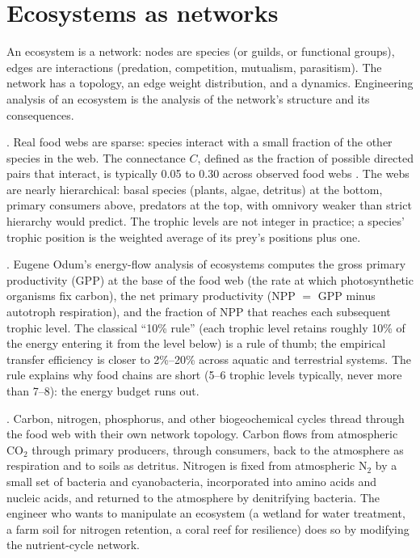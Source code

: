 \section{Ecosystems as networks}

An ecosystem is a network: nodes are species (or guilds, or
functional groups), edges are interactions (predation, competition,
mutualism, parasitism). The network has a topology, an edge weight
distribution, and a dynamics. Engineering analysis of an ecosystem
is the analysis of the network's structure and its consequences.

. Real food webs are sparse: species
interact with a small fraction of the other species in the web. The
connectance $C$, defined as the fraction of possible directed pairs
that interact, is typically 0.05 to 0.30 across observed food webs
\cite[ch.~4]{text:v6c08-may-stability}. The webs are nearly hierarchical:
basal species (plants, algae, detritus) at the bottom, primary
consumers above, predators at the top, with omnivory weaker than
strict hierarchy would predict. The trophic levels are not integer
in practice; a species' trophic position is the weighted average
of its prey's positions plus one.



. Eugene
Odum's energy-flow analysis of ecosystems
\cite[chs.~3--4]{text:v6c08-odum-1971} computes the gross
primary productivity (GPP) at the base of the food web (the rate
at which photosynthetic organisms fix carbon), the net primary
productivity (NPP $=$ GPP minus autotroph respiration), and the
fraction of NPP that reaches each subsequent trophic level. The
classical ``10\% rule'' (each trophic level retains roughly 10\% of
the energy entering it from the level below) is a rule of thumb;
the empirical transfer efficiency is closer to 2\%--20\% across
aquatic and terrestrial systems. The rule explains why food chains
are short (5--6 trophic levels typically, never more than 7--8): the
energy budget runs out.

. Carbon, nitrogen, phosphorus, and other
biogeochemical cycles thread through the food web with their own
network topology. Carbon flows from atmospheric CO$_2$ through
primary producers, through consumers, back to the atmosphere as
respiration and to soils as detritus. Nitrogen is fixed from
atmospheric N$_2$ by a small set of bacteria and cyanobacteria,
incorporated into amino acids and nucleic acids, and returned to
the atmosphere by denitrifying bacteria. The engineer who wants to
manipulate an ecosystem (a wetland for water treatment, a farm soil
for nitrogen retention, a coral reef for resilience) does so by
modifying the nutrient-cycle network.

